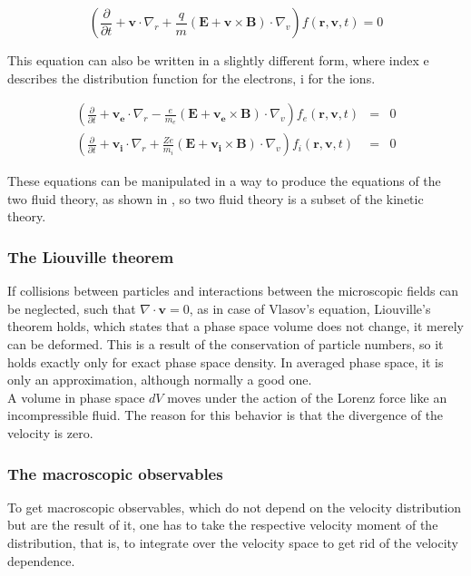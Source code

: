 \documentclass[a4paper,11pt]{thesis}
\begin{document}
\begin{equation}\label{vlasov1}
\left( \frac{\partial}{\partial t} + \mathbf{v}\cdot
\nabla_r+\frac{q}{m}(\mathbf{E}+\mathbf{v}\times
\mathbf{B})\cdot\nabla_v \right) f(\mathbf{r,v},t) =0
\end{equation}

This equation can also be written in a slightly different form,
where index e describes the distribution function for the electrons,
i for the ions.

\begin{eqnarray}
\left( \frac{\partial}{\partial t} + \mathbf{v_e}\cdot
\nabla_r-\frac{e}{m_e}(\mathbf{E}+\mathbf{v_e}\times
\mathbf{B})\cdot\nabla_v \right) f_e(\mathbf{r,v},t) &=& 0
\label{vlasov_e}\\ \left( \frac{\partial}{\partial t} +
\mathbf{v_i}\cdot
\nabla_r+\frac{Ze}{m_i}(\mathbf{E}+\mathbf{v_i}\times
\mathbf{B})\cdot\nabla_v \right) f_i(\mathbf{r,v},t) &=&
0\label{vlasov_i}
\end{eqnarray}

These equations can be manipulated in a way to produce the equations
of the two fluid theory, as shown in \cite{kippenhahn}, so two fluid
theory is a subset of the kinetic theory.

\subsubsection{The Liouville theorem}
If collisions between particles and interactions between the microscopic
fields can be neglected, such that $\nabla \cdot \mathbf{v}=0$, as
in case of Vlasov's equation, Liouville's theorem holds, which
states that a phase space volume does not change, it merely can be
deformed. This is a result of the conservation of particle numbers,
so it holds exactly only for exact phase space density. In averaged
phase space, it is only an approximation, although normally a good
one.\\

A volume in phase space $dV$ moves under the action of the Lorenz
force like an incompressible fluid. The reason for this behavior is
that the divergence of the velocity is zero.

\subsubsection{The macroscopic observables}
To get macroscopic observables, which do not depend on the velocity
distribution but are the result of it, one has to take the
respective velocity moment of the distribution, that is, to integrate
over the velocity space to get rid of the velocity dependence.
\end{document}
